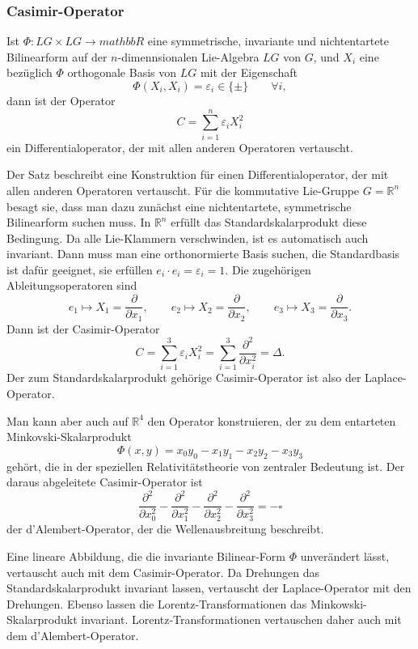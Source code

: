 %
%
\subsubsection{Casimir-Operator}

\begin{satz}
Ist $\Phi\colon LG\times LG\to mathbb{R}$ eine symmetrische, invariante
und nichtentartete Bilinearform auf der $n$-dimennsionalen Lie-Algebra
$LG$ von $G$, und $X_i$ eine bezüglich $\Phi$
orthogonale Basis von $LG$ mit der Eigenschaft
\[
\Phi(X_i,X_i) = \varepsilon_i \in \{\pm\}\qquad\forall i,
\]
dann ist der Operator
\[
C
=
\sum_{i=1}^n \varepsilon_i X_i^2
\]
ein Differentialoperator, der mit allen anderen Operatoren vertauscht.
\end{satz}

Der Satz beschreibt eine Konstruktion für einen Differentialoperator,
der mit allen anderen Operatoren vertauscht.
Für die kommutative Lie-Gruppe $G=\mathbb{R}^n$ besagt sie, dass man
dazu zunächst eine nichtentartete, symmetrische Bilinearform suchen muss.
In $\mathbb{R}^n$ erfüllt das Standardskalarprodukt diese Bedingung.
Da alle Lie-Klammern verschwinden, ist es automatisch auch invariant.
Dann muss man eine orthonormierte Basis suchen, die Standardbasis
ist dafür geeignet, sie erfüllen $e_i\cdot e_i=\varepsilon_i=1$.
Die zugehörigen Ableitungsoperatoren sind
\[
e_1 \mapsto X_1 = \frac{\partial}{\partial x_1},
\qquad
e_2 \mapsto X_2 = \frac{\partial}{\partial x_2},
\qquad
e_3 \mapsto X_3 = \frac{\partial}{\partial x_3}.
\]
Dann ist der Casimir-Operator
\[
C=
\sum_{i=1}^3 \varepsilon_i X_i^2
=
\sum_{i=1}^3 \frac{\partial^2}{\partial x_i^2}
=
\Delta.
\]
Der zum Standardskalarprodukt gehörige Casimir-Operator ist also
der Laplace-Operator.

Man kann aber auch auf $\mathbb{R}^4$ den Operator konstruieren, der
zu dem entarteten Minkovski-Skalarprodukt
\[
\Phi(x,y)
=
x_0y_0
-
x_1y_1
-
x_2y_2
-
x_3y_3
\]
gehört, die in der speziellen Relativitätstheorie von zentraler Bedeutung
ist.
Der daraus abgeleitete Casimir-Operator ist
\[
\frac{\partial^2}{\partial x_0^2}
-
\frac{\partial^2}{\partial x_1^2}
-
\frac{\partial^2}{\partial x_2^2}
-
\frac{\partial^2}{\partial x_3^2}
=
-\square
\]
der d'Alembert-Operator, der die Wellenausbreitung beschreibt.

Eine lineare Abbildung, die die invariante Bilinear-Form $\Phi$ unverändert
lässt, vertauscht auch mit dem Casimir-Operator.
Da Drehungen das Standardskalarprodukt invariant lassen, vertauscht
der Laplace-Operator mit den Drehungen.
Ebenso lassen die Lorentz-Transformationen das Minkowski-Skalarprodukt
invariant.
Lorentz-Transformationen vertauschen daher auch mit dem d'Alembert-Operator.

